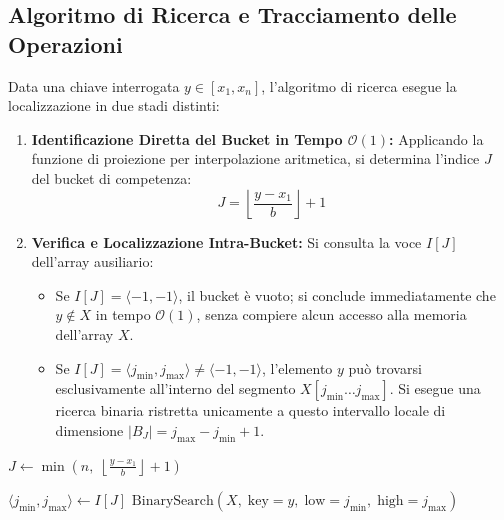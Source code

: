 \FloatBarrier
\subsection{Algoritmo di Ricerca e Tracciamento delle Operazioni}
\label{subsec:algoritmo-search-bucket}

Data una chiave interrogata $y \in [x_1, x_n]$, l'algoritmo di ricerca esegue la localizzazione in due stadi distinti:
\begin{enumerate}
  \item \textbf{Identificazione Diretta del Bucket in Tempo $\mathcal{O}(1)$:}
  Applicando la funzione di proiezione per interpolazione aritmetica, si determina l'indice $J$ del bucket di competenza:
  \begin{equation}
    J = \left\lfloor \frac{y - x_1}{b} \right\rfloor + 1
  \end{equation}
  \item \textbf{Verifica e Localizzazione Intra-Bucket:}
  Si consulta la voce $I[J]$ dell'array ausiliario:
  \begin{itemize}
    \item Se $I[J] = \langle -1, -1 \rangle$, il bucket \`e vuoto; si conclude immediatamente che $y \notin X$ in tempo $\mathcal{O}(1)$, senza compiere alcun accesso alla memoria dell'array $X$.
    \item Se $I[J] = \langle j_{\min}, j_{\max} \rangle \neq \langle -1, -1 \rangle$, l'elemento $y$ pu\`o trovarsi esclusivamente all'interno del segmento $X[j_{\min} \dots j_{\max}]$. Si esegue una ricerca binaria ristretta unicamente a questo intervallo locale di dimensione $|B_J| = j_{\max} - j_{\min} + 1$.
  \end{itemize}
\end{enumerate}

\begin{algorithm}[H]
\caption{Bucket Interpolation Search}
\label{algo:bucket-search}

\BlankLine
{}

\BlankLine
{}
$J \leftarrow \min\left(n, \; \left\lfloor \frac{y - x_1}{b} \right\rfloor + 1 \right)$\;

\BlankLine
{}

$\langle j_{\min}, j_{\max} \rangle \leftarrow I[J]$\;
\Return $\text{BinarySearch}(X, \; \text{key} = y, \; \text{low} = j_{\min}, \; \text{high} = j_{\max})$\;
\end{algorithm}

